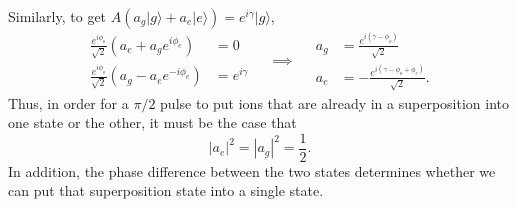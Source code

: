 Similarly, to get $A\left(a_g|g\rangle+a_e|e\rangle\right)=e^{i\gamma}|g\rangle$,
\begin{equation}
\begin{aligned}
\frac{e^{i\phi_o}}{\sqrt{2}}\left(a_e+a_ge^{i\phi_e}\right) &= 0 \\
\frac{e^{i\phi_o}}{\sqrt{2}}\left(a_g-a_e e^{-i\phi_e}\right) &= e^{i\gamma} 
\end{aligned}
\quad\implies\quad
\begin{aligned}
a_g&=\frac{e^{i(\gamma-\phi_o)}}{\sqrt{2}}\\
a_e&=-\frac{e^{i(\gamma-\phi_o+\phi_e)}}{\sqrt{2}}.
\end{aligned}
\end{equation}
Thus, in order for a $\pi/2$ pulse to put ions that are already in a superposition into one state or the other, it must be the case that 
\begin{equation}
|a_e|^2=|a_g|^2=\frac{1}{2}.
\end{equation}
In addition, the phase difference between the two states determines whether we can put that superposition state into a single state.  

